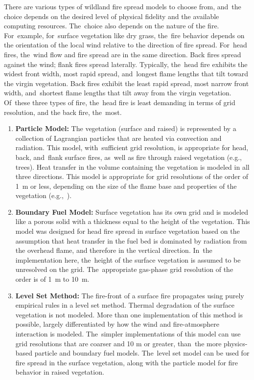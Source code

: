 \documentclass[atmosphere,article,accept,moreauthors,pdftex]{Definitions/mdpi}
\begin{document}
\begin{paracol}{2}
There are various types of wildland fire spread models to choose from, and~the choice depends on the desired level of physical fidelity and the available computing resources. The~choice also depends on the nature of the fire. For~example, for~surface vegetation like dry grass, the~fire behavior depends on the orientation of the local wind relative to the direction of fire spread. For~head fires, the~wind flow and fire spread are in the same direction. Back fires spread against the wind; flank fires spread laterally. Typically, the~head fire exhibits the widest front width, most rapid spread, and~longest flame lengths that tilt toward the virgin vegetation. Back fires exhibit the least rapid spread, most narrow front width, and~shortest flame lengths that tilt away from the virgin vegetation. Of~these three types of fire, the~head fire is least demanding in terms of grid resolution, and the back fire, the~most.
\begin{enumerate}
\item {\bf Particle Model:} %
The vegetation (surface and raised) is represented by a collection of Lagrangian particles that are heated via convection and radiation. This model, with~sufficient grid resolution, is appropriate for head, back, and~flank surface fires, as~well as fire through raised vegetation (e.g., trees). Heat transfer in the volume containing the vegetation is modeled in all three directions. This model is appropriate for grid resolutions of the order of 1~m or less, depending on the size of the flame base and properties of the vegetation (e.g.,~\cite{Perez-Ramirez:FT2017}).
\item {\bf Boundary Fuel Model:} Surface vegetation has its own grid and is modeled like a porous solid with a thickness equal to the height of the vegetation. This model was designed for head fire spread in surface vegetation based on the assumption that heat transfer in the fuel bed is dominated by radiation from the overhead flame, and therefore in the vertical direction.  In~the implementation here, the~height of the surface vegetation is assumed to be unresolved on the grid. The~appropriate gas-phase grid resolution of the order is of 1~m to 10~m.
\item {\bf Level Set Method:} The fire-front of a surface fire propagates using purely empirical rules in a level set method. Thermal degradation of the surface vegetation is not modeled. More than one implementation of this method is possible, largely differentiated by how the wind and fire-atmosphere interaction is modeled. The~simpler implementations of this model can use grid resolutions that are coarser and 10 m or greater, than~the more physics-based particle and boundary fuel models. The~level set model can be used for fire spread in the surface vegetation, along with the particle model for fire behavior in raised vegetation. 
\end{enumerate}


\end{paracol}
\end{document}

